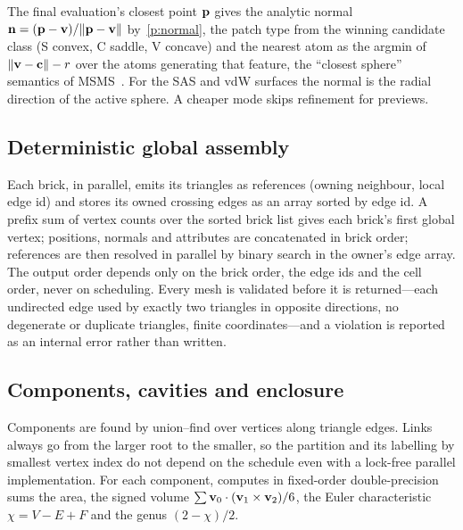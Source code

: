 The final evaluation's closest point $\mathbf{p}$ gives the analytic normal
$\mathbf{n} = (\mathbf{p} - \mathbf{v})/\lVert\mathbf{p} - \mathbf{v}\rVert$ by~\ref{p:normal},
the patch type from the winning candidate class (S convex, C saddle, V
concave) and the nearest atom as the argmin of
$\lVert\mathbf{v} - \mathbf{c}\rVert - r$ over the atoms generating that feature, the
``closest sphere'' semantics of MSMS~\cite{sanner1996}. For the SAS and vdW
surfaces the normal is the radial direction of the active sphere. A
cheaper  mode skips refinement for previews.

\subsection{Deterministic global assembly}
\label{sec:assembly}

Each brick, in parallel, emits its triangles as references
(owning neighbour, local edge id) and stores its owned crossing edges as an
array sorted by edge id. A prefix sum of vertex counts over the sorted
brick list gives each brick's first global vertex; positions, normals and
attributes are concatenated in brick order; references are then resolved
in parallel by binary search in the owner's edge array. The output order
depends only on the brick order, the edge ids and the cell order, never on
scheduling. Every mesh is validated before it is returned---each undirected
edge used by exactly two triangles in opposite directions, no degenerate or
duplicate triangles, finite coordinates---and a violation is reported as an
internal error rather than written.

\subsection{Components, cavities and enclosure}
\label{sec:cavities}

Components are found by union--find over vertices along triangle edges.
Links always go from the larger root to the smaller, so the partition and
its labelling by smallest vertex index do not depend on the schedule even
with a lock-free parallel implementation. For each component, \sesmesh{}
computes in fixed-order double-precision sums the area, the signed volume
$\sum \mathbf{v}_0 \cdot (\mathbf{v}_1 \times \mathbf{v}_2)/6$, the Euler
characteristic $\chi = V - E + F$ and the genus $(2 - \chi)/2$.

